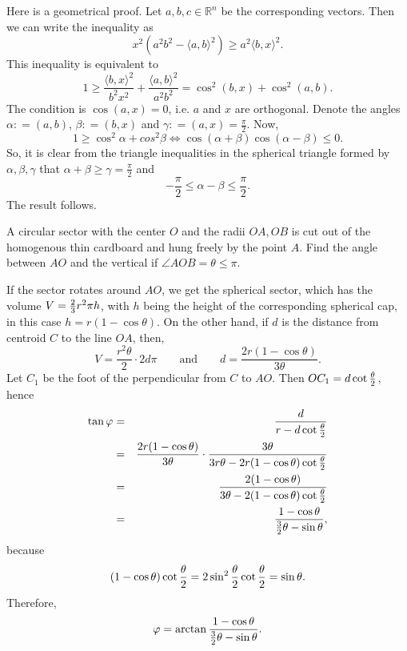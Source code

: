 \documentclass[12pt,a4paper]{memoir}
\theoremstyle{definition}
\begin{document}
\begin{solution}[name={Solution by Spanferkel}] 
	Here is a geometrical proof. Let $a,b,c\in\mathbb{R}^n$ be the corresponding vectors. Then we can write the inequality as
	\[x^2(a^2b^2- \langle a,b \rangle ^2)\ge a^2 \langle b,x \rangle ^2.\]
	This inequality is equivalent to
	\[ 1\ge\frac{ \langle b,x \rangle ^2}{b^2x^2}+\frac{ \langle a,b \rangle ^2}{a^2b^2}=\cos^2(b,x)+\cos^2(a,b).\]
	The condition is $\cos(a,x)=0$, i.e. $a$ and $x$ are orthogonal. Denote the angles $\alpha: =(a,b)$, $\beta: =(b,x)$ and $\gamma: =(a,x)=\frac\pi2$. Now,
	\[1\ge\cos^2\alpha+cos^2\beta \Leftrightarrow\cos(\alpha+\beta)\cos(\alpha-\beta)\leq 0.\] 
	So, it is clear from the triangle inequalities in the spherical triangle formed by $\alpha,\beta, \gamma$ that $\alpha+\beta\ge\gamma=\frac\pi2$ and \[-\frac\pi2\le\alpha-\beta\le\frac{\pi}2.\] The result follows.
\end{solution}






\begin{question}[name={Hanging Sector by Farenhajt}]
	A circular sector with the center $O$ and the radii $OA, OB$ is cut out of the homogenous thin cardboard and hung freely by the point $A$. Find the angle between $AO$ and the vertical if $\angle AOB=\theta\leq\pi$.
\end{question}





\begin{solution}[name={Solution by Farenhajt}] 
	If the sector rotates around $AO$, we get the spherical sector, which has the volume $V={2\over 3}r^{2}\pi h$, with $h$ being the height of the corresponding spherical cap, in this case $h=r(1-\cos\theta)$. On the other hand, if $d$ is the distance from centroid $C$ to the line $OA$, then, \[V=\frac{r^{2}\theta}{2}\cdot 2d\pi \qquad \text{and} \qquad d=\frac{2r(1-\cos\theta)}{3\theta}.\]
	Let $C_{1}$ be the foot of the perpendicular from $C$ to $AO$. Then $OC_{1}=d\cot{\theta\over 2}$, hence
	\begin{eqnarray*}\tan\varphi &=& \frac{d}{r-d\cot{\theta\over 2}}\\ &=& \frac{2r(1-\cos\theta)}{3\theta}\cdot\frac{3\theta}{3r\theta-2r(1-\cos\theta)\cot{\theta\over 2}}\\ &=& \frac{2(1-\cos\theta)}{3\theta-2(1-\cos\theta)\cot{\theta\over 2}}\\ &=& \frac{1-\cos\theta}{{3\over 2}\theta-\sin\theta},\end{eqnarray*}
	because \[(1-\cos\theta)\cot{\theta\over 2}=2\sin^{2}{\theta\over 2}\cot{\theta\over 2}=\sin\theta.\]
	Therefore, \[\varphi=\arctan\frac{1-\cos\theta}{{3\over 2}\theta-\sin\theta}.\]
\end{solution}
\end{document}
